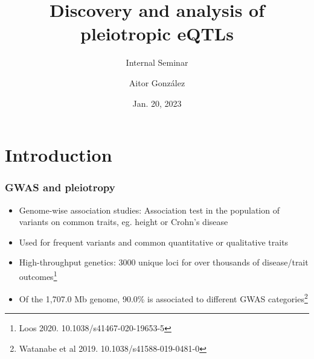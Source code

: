 \documentclass{beamer}
\title{Discovery and analysis of pleiotropic eQTLs}
\subtitle{Internal Seminar}
\author{Aitor Gonz\'alez}
\institute{Aix Marseille Univ, INSERM, TAGC}
\date{Jan. 20, 2023}
\begin{document}
    \begin{frame}

        \titlepage

    \end{frame}

    \section{Introduction} %

    \begin{frame}
        \frametitle{GWAS and pleiotropy}

        \begin{itemize}
            \item Genome-wise association studies: Association test in the population of variants on common traits, eg. height or Crohn's disease
            \item Used for frequent variants and common quantitative or qualitative traits
            \item High-throughput genetics: 3000 unique loci for over thousands of disease/trait outcomes\footnote{Loos 2020. 10.1038/s41467-020-19653-5}
            \item Of the 1,707.0 Mb genome, 90.0\% is associated to different GWAS categories\footnote{Watanabe et al 2019. 10.1038/s41588-019-0481-0}
        \end{itemize}
%


    \end{frame}
\end{document}
